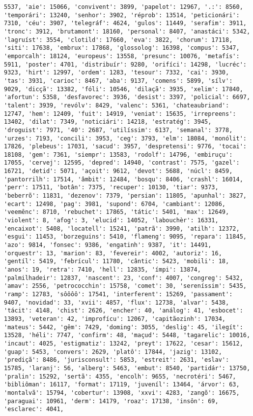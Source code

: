\begin{Verbatim}[commandchars=\\\{\}]
5537, 'aie': 15066, 'convivent': 3899, 'papelot': 12967, '.:': 8560, 'temporári': 13240, 'senhor': 3902, 'réprob': 13514, 'peticionári': 7310, 'céu': 3907, 'telegráf': 4624, 'gulos': 11449, 'serafim': 3911, 'tronc': 3912, 'brutamont': 18160, 'personal': 8407, 'anastáci': 5342, 'lagruíst': 3554, 'clotild': 17660, 'eva': 3822, 'chorum': 17118, 'siti': 17638, 'embrux': 17868, 'glossolog': 16398, 'compus': 5347, 'emporcalh': 18124, 'europeus': 13558, 'presunc': 10076, 'metafís': 5911, 'poster': 4701, 'distribuír': 9280, 'orifíci': 14298, 'lucréc': 9323, 'hirt': 12997, 'ordem': 1283, 'tesour': 7332, 'cai': 3930, 'tas': 3931, 'carioc': 8467, 'aba': 9137, 'comens': 5899, 'sílv': 9029, 'dicçã': 13382, 'fóli': 10546, 'dilaçã': 3935, 'xelim': 17840, 'afortun': 5358, 'desfavorec': 3936, 'desist': 3397, 'policial': 6697, 'talent': 3939, 'revólv': 8429, 'valenc': 5361, 'chateaubriand': 12747, 'hem': 12409, 'fuit': 14919, 'veniat': 15635, 'irrepreens': 13402, 'dilat': 7349, 'noticiári': 14218, 'estratég': 3945, 'droguist': 7971, '40': 2687, 'utilíssim': 6137, 'semanal': 3778, 'urzes': 7193, 'concili': 3953, 'ceg': 3793, 'elm': 18084, 'monólit': 17826, 'plebeus': 17031, 'sacud': 3957, 'despretensi': 9776, 'tocai': 18108, 'gem': 7361, 'siempr': 13583, 'rodolf': 14796, 'embiruçu': 17055, 'cervej': 12595, 'depred': 14940, 'contrast': 7575, 'gazel': 16721, 'detid': 5071, 'açoit': 9612, 'devot': 5688, 'núcl': 8459, 'pantorrilh': 17514, 'âmbit': 12484, 'bosqu': 8406, 'crashl': 16014, 'perr': 17511, 'botân': 7375, 'recuper': 10130, 'tiar': 9373, 'beberrõ': 11831, 'dezenov': 7379, 'persian': 11805, 'apunhal': 3827, 'ecart': 12498, 'pag': 3981, 'supond': 6704, 'cambiant': 12086, 'veemênc': 8710, 'rebuchet': 17865, 'tátic': 5401, 'max': 12649, 'violent': 8, 'afog': 3, 'elucid': 14052, 'labouchèr': 16331, 'encaixot': 5408, 'locatell': 15241, 'patrã': 3990, 'atilh': 12372, 'esgui': 11453, 'borzeguins': 5410, 'flameng': 9095, 'repara': 11845, 'azo': 9814, 'fonsec': 9386, 'engatinh': 9387, 'it': 14491, 'orquestr': 13, 'marion': 83, 'fevereir': 4002, 'autoriz': 16, 'gentíl': 5419, 'febrícul': 11780, 'cântic': 5423, 'mobili': 18, 'anos': 19, 'retra': 7410, 'hell': 12835, 'ímpi': 13874, 'palmilhadeir': 12837, 'nascent': 23, 'conf': 4007, 'congreg': 5432, 'amav': 2556, 'petrococchin': 15758, 'comet': 30, 'sereníssim': 5435, 'ramp': 12783, 'sôôôô': 17541, 'interferent': 15269, 'passament': 9407, 'novidad': 33, 'xvii': 4857, 'flux': 12738, 'alvar': 5438, 'tácit': 4148, 'chist': 2626, 'encher': 40, 'análog': 41, 'esbocet': 13893, 'veteran': 42, 'improfícu': 12067, 'capitãozinh': 17034, 'mateus': 5442, 'gêm': 7429, 'doming': 3055, 'deslig': 45, 'ilegít': 13528, 'héli': 7747, 'confirm': 48, 'maçud': 5448, 'tagarelic': 10016, 'incaut': 4025, 'estigmatiz': 13242, 'preyt': 17622, 'cesar': 15612, 'guap': 5453, 'convers': 2629, 'platô': 17844, 'jazig': 13102, 'prediçã': 8486, 'jurisconsult': 5853, 'estreit': 2631, 'eslav': 15785, 'laranj': 56, 'alberg': 5463, 'embut': 8540, 'partidár': 13750, 'pralin': 15292, 'sertã': 4355, 'encolh': 9655, 'necrotéri': 5467, 'bibliôman': 16117, 'format': 17119, 'juveníl': 13464, 'árvor': 63, 'montalvã': 15794, 'cobertur': 13908, 'xxvi': 4283, 'zangõ': 16675, 'paraguai': 10961, 'derm': 14179, 'roaz': 17138, 'insôn': 69, 'esclarec': 4041, 
\end{Verbatim}
